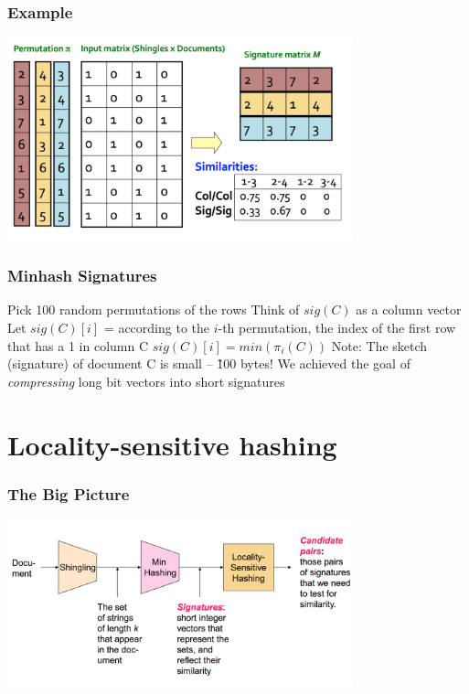 \documentclass[svgnames]{beamer}
\begin{document}
  
\begin{frame} \frametitle{Example}
\includegraphics[width=10cm]{example}
\end{frame}

  
\begin{frame} \frametitle{Minhash Signatures}

Pick 100 random permutations of the rows
Think of $sig(C)$ as a column vector
Let $sig(C)[i]$ = according to the $i$-th permutation, the index of the first row that has a 1 in column C
   $sig(C)[i] = min (\pi_i(C))$
Note: The sketch (signature) of document C is small -- \~100 bytes!
We achieved the goal of \emph{compressing} long bit vectors into short signatures

\end{frame}

  
\section{Locality-sensitive hashing}

  
\begin{frame} \frametitle{The Big Picture}

\includegraphics[width=10cm]{overall}

\end{frame}
\end{document}
